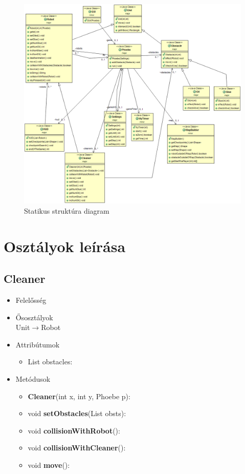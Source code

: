 \begin{figure}[h]
\begin{center}
\includegraphics[width=17cm]{images/struktdiagram.PNG}
\caption{Statikus struktúra diagram}
\label{fig:example3}
\end{center}
\end{figure}
\pagebreak


\section{Osztályok leírása}

\subsection{Cleaner}
\begin{itemize}
\item Felelősség\\

\item Ősosztályok\\
Unit$\rightarrow$Robot
\item Attribútumok
    \begin{itemize}
        \item List obstacles:  
    \end{itemize}
\item Metódusok
	\begin{itemize}
	    \item \textbf{Cleaner}(int x, int y, Phoebe p):
		\item void \textbf{setObstacles}(List obsts): 
		\item void \textbf{collisionWithRobot}():
		\item void \textbf{collisionWithCleaner}():
		\item void \textbf{move}():
	\end{itemize}
\end{itemize}

